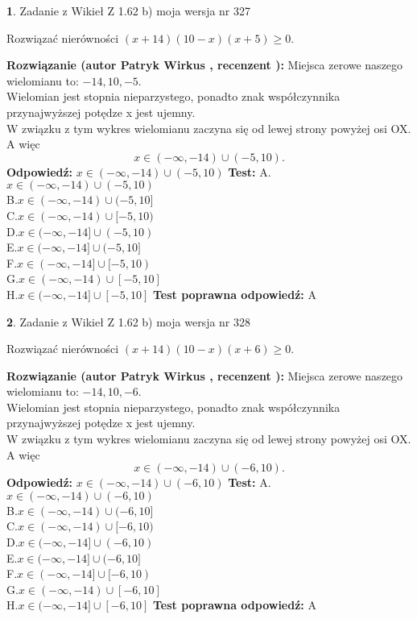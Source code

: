 \documentclass[12pt, a4paper]{article}
\theoremstyle{definition} %
\newtheorem{zad}{}
\newcommand{\zadStart}[1]{\begin{zad}#1\newline}
\newcommand{\zadStop}{\end{zad}}
\newcommand{\rozwStart}[2]{\noindent \textbf{Rozwiązanie (autor #1 , recenzent #2): }\newline}
\newcommand{\rozwStop}{\newline}
\newcommand{\odpStart}{\noindent \textbf{Odpowiedź:}\newline}
\newcommand{\odpStop}{\newline}
\newcommand{\testStart}{\noindent \textbf{Test:}\newline}
\newcommand{\testStop}{\newline}
\newcommand{\kluczStart}{\noindent \textbf{Test poprawna odpowiedź:}\newline}
\newcommand{\kluczStop}{\newline}
\begin{document}
\zadStart{Zadanie z Wikieł Z 1.62 b) moja wersja nr 327}

Rozwiązać nierówności $(x+14)(10-x)(x+5)\ge0$.
\zadStop
\rozwStart{Patryk Wirkus}{}
Miejsca zerowe naszego wielomianu to: $-14, 10, -5$.\\
Wielomian jest stopnia nieparzystego, ponadto znak współczynnika przy\linebreak najwyższej potędze x jest ujemny.\\ W związku z tym wykres wielomianu zaczyna się od lewej strony powyżej osi OX. A więc $$x \in (-\infty,-14) \cup (-5,10).$$
\rozwStop
\odpStart
$x \in (-\infty,-14) \cup (-5,10)$
\odpStop
\testStart
A.$x \in (-\infty,-14) \cup (-5,10)$\\
B.$x \in (-\infty,-14) \cup (-5,10]$\\
C.$x \in (-\infty,-14) \cup [-5,10)$\\
D.$x \in (-\infty,-14] \cup (-5,10)$\\
E.$x \in (-\infty,-14] \cup (-5,10]$\\
F.$x \in (-\infty,-14] \cup [-5,10)$\\
G.$x \in (-\infty,-14) \cup [-5,10]$\\
H.$x \in (-\infty,-14] \cup [-5,10]$
\testStop
\kluczStart
A
\kluczStop



\zadStart{Zadanie z Wikieł Z 1.62 b) moja wersja nr 328}

Rozwiązać nierówności $(x+14)(10-x)(x+6)\ge0$.
\zadStop
\rozwStart{Patryk Wirkus}{}
Miejsca zerowe naszego wielomianu to: $-14, 10, -6$.\\
Wielomian jest stopnia nieparzystego, ponadto znak współczynnika przy\linebreak najwyższej potędze x jest ujemny.\\ W związku z tym wykres wielomianu zaczyna się od lewej strony powyżej osi OX. A więc $$x \in (-\infty,-14) \cup (-6,10).$$
\rozwStop
\odpStart
$x \in (-\infty,-14) \cup (-6,10)$
\odpStop
\testStart
A.$x \in (-\infty,-14) \cup (-6,10)$\\
B.$x \in (-\infty,-14) \cup (-6,10]$\\
C.$x \in (-\infty,-14) \cup [-6,10)$\\
D.$x \in (-\infty,-14] \cup (-6,10)$\\
E.$x \in (-\infty,-14] \cup (-6,10]$\\
F.$x \in (-\infty,-14] \cup [-6,10)$\\
G.$x \in (-\infty,-14) \cup [-6,10]$\\
H.$x \in (-\infty,-14] \cup [-6,10]$
\testStop
\kluczStart
A
\kluczStop
\end{document}
